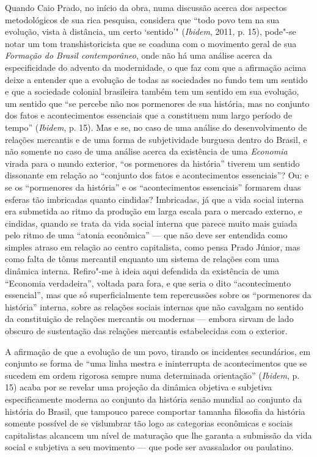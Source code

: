 Quando Caio Prado, no início da obra, numa discussão acerca dos aspectos
metodológicos de sua rica pesquisa, considera que ``todo povo tem na sua
evolução, vista à distância, um certo `sentido'" (\emph{Ibidem}, 2011,
p. 15), pode"-se notar um tom transhistoricista que se coaduna com o
movimento geral de sua \emph{Formação do Brasil contemporâneo}, onde não
há uma análise acerca da especificidade do advento da modernidade, o que
faz com que a afirmação acima deixe a entender que a evolução de todas
as sociedades no fundo tem um sentido e que a sociedade colonial
brasileira também tem um sentido em sua evolução, um sentido que ``se
percebe não nos pormenores de sua história, mas no conjunto dos fatos e
acontecimentos essenciais que a constituem num largo período de tempo''
(\emph{Ibidem}, p. 15). Mas e se, no caso de uma análise do
desenvolvimento de relações mercantis e de uma forma de subjetividade
burguesa dentro do Brasil, e não somente no caso de uma análise acerca
da existência de uma \emph{Economia} virada para o mundo exterior, ``os
pormenores da história'' tiverem um sentido dissonante em relação ao
``conjunto dos fatos e acontecimentos essenciais''? Ou: e se os
``pormenores da história'' e os ``acontecimentos essenciais'' formarem
duas esferas tão imbricadas quanto cindidas? Imbricadas, já que a vida
social interna era submetida ao ritmo da produção em larga escala para o
mercado externo, e cindidas, quando se trata da vida social interna que
parece muito mais guiada pelo ritmo de uma ``atonia econômica'' --- que
não deve ser entendida como simples atraso em relação ao centro
capitalista, como pensa Prado Júnior, mas como falta de tônus mercantil
enquanto um sistema de relações com uma dinâmica interna.
Refiro"-me à ideia aqui defendida da existência de uma ``Economia
verdadeira'', voltada para fora, e que seria o dito ``acontecimento
essencial'', mas que só superficialmente tem repercussões sobre os
``pormenores da história'' interna, sobre as relações sociais internas
que não cavalgam no sentido da constituição de relações mercantis ou
modernas --- embora sirvam de lado obscuro de sustentação das relações
mercantis estabelecidas com o exterior.

A afirmação de que a evolução de um povo, tirando os
incidentes secundários, em conjunto se forma de ``uma linha mestra e
ininterrupta de acontecimentos que se sucedem em ordem rigorosa sempre
numa determinada orientação'' (\emph{Ibidem}, p. 15) acaba por se
revelar uma projeção da dinâmica objetiva e subjetiva especificamente
moderna ao conjunto da história senão mundial ao conjunto da história do
Brasil, que tampouco parece comportar tamanha filosofia da história
somente possível de se vislumbrar tão logo as categorias econômicas e
sociais capitalistas alcancem um nível de maturação que lhe garanta a
submissão da vida social e subjetiva a seu movimento --- que pode ser
avassalador ou paulatino.

